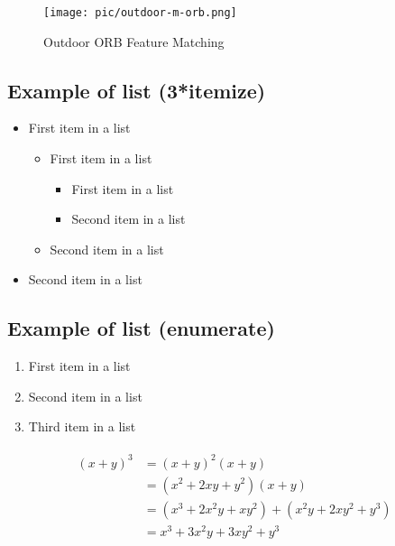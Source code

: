 \documentclass[paper=a4, fontsize=11pt]{scrartcl} %
\numberwithin{equation}{section} %
\numberwithin{figure}{section} %
\numberwithin{table}{section} %
\begin{document}
\begin{figure}[htbp]
\centering
\texttt{[image: pic/outdoor-m-orb.png]}
\caption{Outdoor ORB Feature Matching}
\label{fig:outdoor-m-orb}
\end{figure}



\subsection{Example of list (3*itemize)}
\begin{itemize}
	\item First item in a list 
		\begin{itemize}
		\item First item in a list 
			\begin{itemize}
			\item First item in a list 
			\item Second item in a list 
			\end{itemize}
		\item Second item in a list 
		\end{itemize}
	\item Second item in a list 
\end{itemize}


\subsection{Example of list (enumerate)}
\begin{enumerate}
\item First item in a list 
\item Second item in a list 
\item Third item in a list
\end{enumerate}


\begin{align} 
\begin{split}
(x+y)^3 	&= (x+y)^2(x+y)\\
&=(x^2+2xy+y^2)(x+y)\\
&=(x^3+2x^2y+xy^2) + (x^2y+2xy^2+y^3)\\
&=x^3+3x^2y+3xy^2+y^3
\end{split}					
\end{align}
\end{document}
